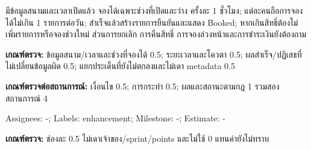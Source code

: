 มีข้อมูลสนามและเวลาเปิดแล้ว จองได้เฉพาะช่วงที่เปิดและว่าง ครั้งละ 1 ชั่วโมง; แต่ละคนถือการจองได้ไม่เกิน 1 รายการต่อวัน; สำเร็จแล้วสร้างรายการยืนยันและแสดง Booked; หากเกินสิทธิ์ต้องไม่เพิ่มรายการหรือจองช่วงใหม่ ส่วนการยกเลิก การคืนสิทธิ์ การจองล่วงหน้าและการชำระเงินยังต้องถาม\par
\textbf{เกณฑ์ตรวจ:} ข้อมูลสนาม/เวลาและช่วงที่จองได้ 0.5; ระยะเวลาและโควตา 0.5; ผลสำเร็จ/ปฏิเสธที่ไม่เปลี่ยนข้อมูลผิด 0.5; แยกประเด็นที่ยังไม่ตกลงและไม่เดา metadata 0.5

\textbf{เกณฑ์ตรวจต่อสถานการณ์:} เงื่อนไข 0.5; การกระทำ 0.5; ผลและสถานะตามกฎ 1 รวมสองสถานการณ์ 4

Assignees: -; Labels: enhancement; Milestone: -; Estimate: -\par
\textbf{เกณฑ์ตรวจ:} ช่องละ 0.5 ไม่เดาเจ้าของ/sprint/points และไม่ใช้ 0 แทนค่ายังไม่ทราบ

